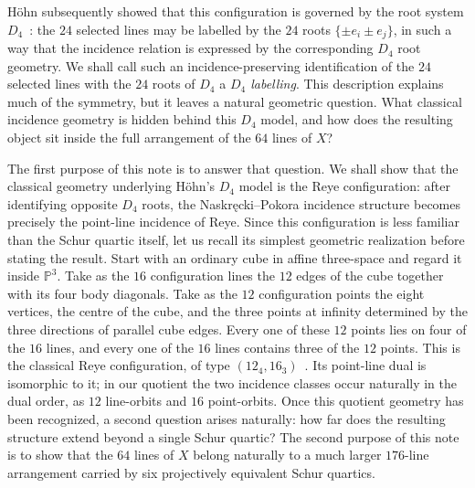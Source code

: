 \documentclass[10pt]{article}
\newcommand{\PP}{\mathbb P}
\begin{document}
H\"ohn subsequently showed that this configuration is governed by the root system $D_4$~\cite{H26}: the $24$ selected lines may be labelled by the $24$ roots $\{\pm e_i\pm e_j\}$, in such a way that the incidence relation is expressed by the corresponding $D_4$ root geometry. We shall call such an incidence-preserving identification of the $24$ selected lines with the $24$ roots of $D_4$ a \emph{$D_4$ labelling}. This description explains much of the symmetry, but it leaves a natural geometric question.  What classical incidence geometry is hidden behind this $D_4$ model, and how does the resulting object sit inside the full arrangement of the $64$ lines of $X$?

The first purpose of this note is to answer that question.  We shall show that the classical geometry underlying H\"ohn's $D_4$ model is the Reye configuration: after identifying opposite $D_4$ roots, the Naskr\k{e}cki--Pokora incidence structure becomes precisely the point-line incidence of Reye.  Since this configuration is less familiar than the Schur quartic itself, let us recall its simplest geometric realization before stating the result.  Start with an ordinary cube in affine three-space and regard it inside $\PP^3$.  Take as the $16$ configuration lines the $12$ edges of the cube together with its four body diagonals.  Take as the $12$ configuration points the eight vertices, the centre of the cube, and the three points at infinity determined by the three directions of parallel cube edges.  Every one of these $12$ points lies on four of the $16$ lines, and every one of the $16$ lines contains three of the $12$ points.  This is the classical Reye configuration, of type $(12_4,16_3)$~\cite{Reye82,Grunbaum09,Manivel06}.  Its point-line dual is isomorphic to it; in our quotient the two incidence classes occur naturally in the dual order, as $12$ line-orbits and $16$ point-orbits. Once this quotient geometry has been recognized, a second question arises
naturally: how far does the resulting structure extend beyond a single Schur
quartic?  The second purpose of this note is to show that the $64$ lines of
$X$ belong naturally to a much larger $176$-line arrangement carried by six
projectively equivalent Schur quartics.
\end{document}
